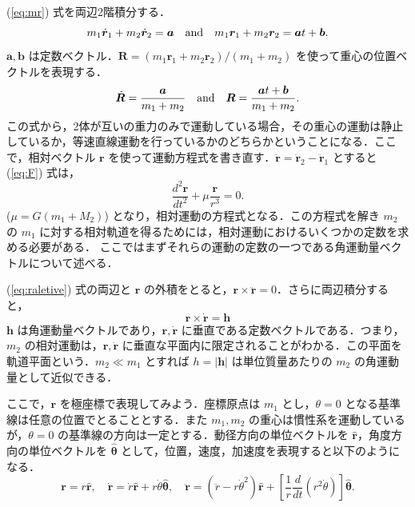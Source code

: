 \documentclass[11pt,a4paper,oneside,onecolumn]{jarticle}
\begin{document}
(\ref{eq:mr}) 式を両辺2階積分する．
\begin{equation}
m_1 \dot{{\bm r}}_1 + m_2 \dot{{\bm r}}_2 = {\bm a} \quad {\rm and} \quad m_1 {\bm r}_1 + m_2 {\bm r}_2 = {\bm a} t + {\bm b}.
\end{equation}
${\bm a}, {\bm b}$ は定数ベクトル．${\bm R} = (m_1 {\bm r}_1 + m_2 {\bm r}_2)/(m_1 + m_2)$ を使って重心の位置ベクトルを表現する．
\begin{equation}
\dot{{\bm R}} = \frac{{\bm a}}{m_1 + m_2} \quad {\rm and} \quad {\bm R} = \frac{{\bm a} t + {\bm b}}{m_1 + m_2}.
\end{equation}
この式から，2体が互いの重力のみで運動している場合，その重心の運動は静止しているか，等速直線運動を行っているかのどちらかということになる．ここで，相対ベクトル ${\bm r}$ を使って運動方程式を書き直す．$\ddot{{\bm r}} = \ddot{{\bm r}}_2 - \ddot{{\bm r}}_1$ とすると (\ref{eq:F}) 式は，
\begin{equation}
\frac{d^2 {\bm r}}{dt^2} + \mu \frac{{\bm r}}{r^3} = 0. \label{eq:raletive}
\end{equation}
($\mu = G (m_1 + M_2)$) となり，相対運動の方程式となる．この方程式を解き $m_2$ の $m_1$ に対する相対軌道を得るためには，相対運動におけるいくつかの定数を求める必要がある． ここではまずそれらの運動の定数の一つである角運動量ベクトルについて述べる．

(\ref{eq:raletive}) 式の両辺と ${\bm r}$ の外積をとると，${\bm r} \times \ddot{{\bm r}} = 0$．さらに両辺積分すると，
\begin{equation}
{\bm r} \times \dot{{\bm r}} = {\bm h} \label{eq:angmom}
\end{equation}
${\bm h}$ は角運動量ベクトルであり，${\bm r}, \dot{{\bm r}}$ に垂直である定数ベクトルである．つまり，$m_2$ の相対運動は，${\bm r}, \dot{{\bm r}}$ に垂直な平面内に限定されることがわかる．この平面を軌道平面という．$m_2 \ll m_1$ とすれば $h = |{\bm h}|$ は単位質量あたりの $m_2$ の角運動量として近似できる．

ここで，${\bm r}$ を極座標で表現してみよう．座標原点は $m_1$ とし，$\theta = 0$ となる基準線は任意の位置でとることとする．また $m_1, m_2$ の重心は慣性系を運動しているが，$\theta = 0$ の基準線の方向は一定とする．動径方向の単位ベクトルを $\hat{{\bm r}}$，角度方向の単位ベクトルを $\hat{{\bm \theta}}$ として，位置，速度，加速度を表現すると以下のようになる．
\begin{equation}
{\bm r} = r \hat{{\bm r}}, \quad \dot{{\bm r}} = \dot{r} \hat{{\bm r}} + r \dot{\theta} \hat{{\bm \theta}}, \quad \ddot{{\bm r}} = (\ddot{r} - r \dot{\theta}^2) \hat{{\bm r}} + \left[ \frac{1}{r} \frac{d}{dt} (r^2 \dot{\theta})\right] \hat{{\bm \theta}}. \label{eq:polar}
\end{equation}
\end{document}
